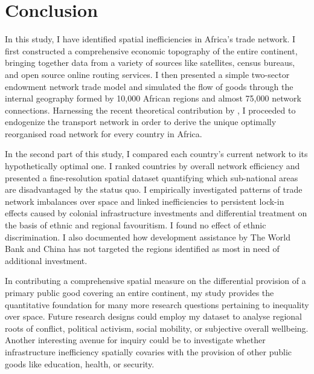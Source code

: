 \documentclass[11pt, oneside]{article}   	%
\begin{document}
\section{Conclusion}
\label{chap:conclusion}

In this study, I have identified spatial inefficiencies in Africa's trade network. I first constructed a comprehensive economic topography of the entire continent, bringing together data from a variety of sources like satellites, census bureaus, and open source online routing services. I then presented a simple two-sector endowment network trade model and simulated the flow of goods through the internal geography formed by 10,000 African regions and almost 75,000 network connections. Harnessing the recent theoretical contribution by \cite{Fajgelbaum_OptimalTransportNetworks_2017}, I proceeded to endogenize the transport network in order to derive the unique optimally reorganised road network for every country in Africa.

In the second part of this study, I compared each country's current network to its hypothetically optimal one. I ranked countries by overall network efficiency and presented a fine-resolution spatial dataset quantifying which sub-national areas are disadvantaged by the status quo. I empirically investigated patterns of trade network imbalances over space and linked inefficiencies to persistent lock-in effects caused by colonial infrastructure investments and differential treatment on the basis of ethnic and regional favouritism. I found no effect of ethnic discrimination. I also documented how development assistance by The World Bank and China has not targeted the regions identified as most in need of additional investment.

In contributing a comprehensive spatial measure on the differential provision of a primary public good covering an entire continent, my study provides the quantitative foundation for many more research questions pertaining to inequality over space. Future research designs could employ my dataset to analyse regional roots of conflict, political activism, social mobility, or subjective overall wellbeing. Another interesting avenue for inquiry could be to investigate whether infrastructure inefficiency spatially covaries with the provision of other public goods like education, health, or security.
\end{document}
